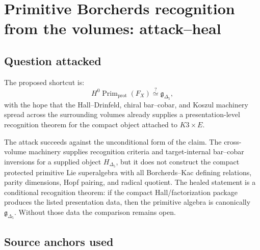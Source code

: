 \section{Primitive Borcherds recognition from the volumes: attack--heal}
\label{sec:primitive-borcherds-recognition-from-volumes-attack-heal}

\providecommand{\Deltafive}{\Delta_{5}}
\providecommand{\gDelta}{\mathfrak g_{\Delta_{5}}}
\providecommand{\HDelta}{H_{\Delta_{5}}}
\providecommand{\Prim}{\operatorname{Prim}}
\providecommand{\Primprot}{\operatorname{Prim}_{\mathrm{prot}}}
\providecommand{\Rad}{\operatorname{Rad}}
\providecommand{\sdim}{\operatorname{sdim}}
\providecommand{\smult}{\operatorname{smult}}
\providecommand{\CoHA}{\operatorname{CoHA}}
\providecommand{\Hall}{\operatorname{Hall}}
\providecommand{\Ran}{\operatorname{Ran}}
\providecommand{\Bch}{B^{\operatorname{ch}}}
\providecommand{\OmegaCh}{\Omega^{\operatorname{ch}}}

\subsection{Question attacked}

The proposed shortcut is:
\[
   H^0\Primprot(F_X)\stackrel{?}{\simeq}\gDelta ,
\]
with the hope that the Hall--Drinfeld, chiral bar--cobar, and Koszul
machinery spread across the surrounding volumes already supplies a
presentation-level recognition theorem for the compact object attached to
\(K3\times E\).

The attack succeeds against the unconditional form of the claim.  The
cross-volume machinery supplies recognition criteria and target-internal
bar--cobar inversions for a supplied object \(\HDelta\), but it does not
construct the compact protected primitive Lie superalgebra with all
Borcherds--Kac defining relations, parity dimensions, Hopf pairing, and
radical quotient.  The healed statement is a conditional recognition theorem:
if the compact Hall/factorization package produces the listed presentation
data, then the primitive algebra is canonically \(\gDelta\).  Without those
data the comparison remains open.

\subsection{Source anchors used}

